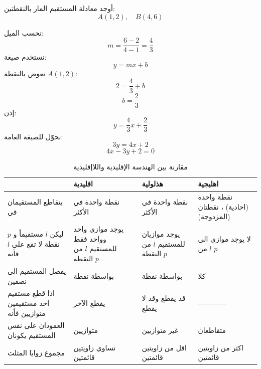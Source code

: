 \begin{example}
	أوجد معادلة المستقيم المار بالنقطتين:
	\[
	A(1,2),\quad B(4,6)
	\]
\end{example}
\begin{solution}
	نحسب الميل:
	\[
	m=\frac{6-2}{4-1}=\frac{4}{3}
	\]
	نستخدم صيغة:
	\[
	y=mx+b
	\]
	نعوض بالنقطة $A(1,2)$:
	\[
	2=\frac{4}{3}+b
	\]
	\[
	b=\frac{2}{3}
	\]
	إذن:
	\[
	y=\frac{4}{3}x+\frac{2}{3}
	\]
	نحوّل للصيغة العامة:
	\[
	3y=4x+2
	\]
	\[
	4x-3y+2=0
	\]
\end{solution}
\renewcommand{\thetable}{}
\begin{table}[ht!]
	\centering
	\renewcommand{\arraystretch}{1.5}
    \begin{tabular}{|p{4.1cm}|p{4.1cm}|p{4.1cm}|p{4.1cm}|}
		\hline
		{}& \textbf{اقليدية} & \textbf{هذلولية} & \textbf{اهليجية} \\\hline
		يتقاطع المستقيمان في & نقطة واحدة في الأكثر & نقطة واحدة في الأكثر & نقطة واحدة (احادية) ، نقطتان (المزدوجة)\\\hline
		ليكن $l$ مستقيماً و $p$ نقطة لا تقع على $l$ فأنه & يوجد موازي واحد وواحد فقط للمستقيم $l$ من النقطة $p$ & يوجد موازيان للمستقيم $l$ من النقطة $p$ & لا يوجد موازي الى $l$ من $p$ \\\hline
		يفصل المستقيم الى نصفين & بواسطة نقطة & بواسطة نقطة & كلا\\\hline
		اذا قطع مستقيم احد مستقيمين متوازيين فأنه & يقطع الآخر & قد يقطع وقد لا يقطع & ------------\\
		\hline
		العمودان على نفس المستقيم يكونان & متوازيين & غير متوازيين & متقاطعان \\
		\hline
		مجموع زوايا المثلث  & تساوي زاويتين قائمتين & اقل من زاويتين قائمتين & اكثر من زاويتين قائمتين\\
		\hline
	\end{tabular}
	\caption{مقارنة بين الهندسة الإقليدية واللاإقليدية}
\end{table}